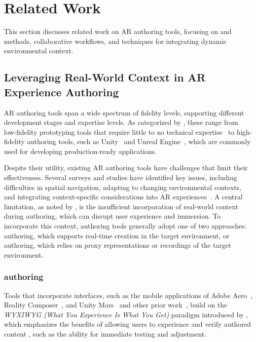 \section{Related Work}
This section discusses related work on AR authoring tools, focusing on \insitu and \exsitu methods, collaborative workflows, and techniques for integrating dynamic environmental context.

\subsection{Leveraging Real-World Context in AR Experience Authoring}
AR authoring tools span a wide spectrum of fidelity levels, supporting different development stages and expertise levels. As categorized by \citet{nebelingTroubleAugmentedReality2018}, these range from low-fidelity prototyping tools that require little to no technical expertise~\cite{adobeAero,nebelingProtoARRapidPhysicalDigital2018,rajaramPaperTrailImmersive2022} to high-fidelity authoring tools, such as Unity~\cite{unity} and Unreal Engine~\cite{unreal}, which are commonly used for developing production-ready applications.

Despite their utility, existing AR authoring tools have challenges that limit their effectiveness. Several surveys and studies have identified key issues, including difficulties in spatial navigation, adapting to changing environmental contexts, and integrating context-specific considerations into AR experiences~\cite{kraussCurrentPracticesChallenges2021, ashtariCreatingAugmentedVirtual2020, kraussElementsXRPrototyping2022, nebelingXRToolsWhere2022}. A central limitation, as noted by \citet{nebelingXRToolsWhere2022}, is the insufficient incorporation of real-world context during authoring, which can disrupt user experience and immersion. To incorporate this context, authoring tools generally adopt one of two approaches: \textit{\insitu} authoring, which supports real-time creation in the target environment, or \textit{\exsitu} authoring, which relies on proxy representations or recordings of the target environment.

\subsubsection{\Insitu authoring}
Tools that incorporate \insitu interfaces, such as the mobile applications of Adobe Aero~\cite{adobeAero}, Reality Composer~\cite{realityComposer}, and Unity Mars~\cite{unityMars} and other prior work~\cite{zollmannComprehensibleInteractiveVisualizations2012,langlotzSketchingWorldSitu2012}, build on the \textit{WYXIWYG (What You Experience Is What You Get)} paradigm introduced by \citet{leeImmersiveAuthoringWhat2005}, which emphasizes the benefits of allowing users to experience and verify authored content \insitu[ ], such as the ability for immediate testing and adjustment. 

